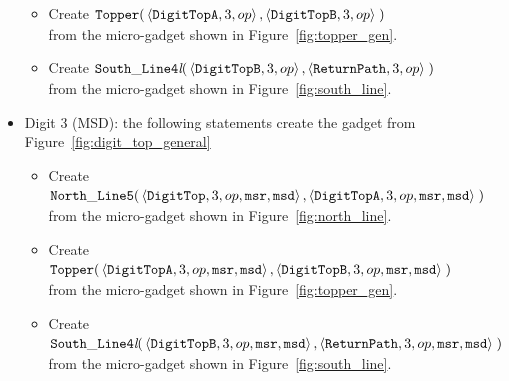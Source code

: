 \begin{itemize}
\begin{itemize}
            \item Create
            $\begin{aligned}[t]
                {\tt Topper}(& \left\langle {\tt DigitTopA}, 3, op  \right\rangle,
                               \left\langle {\tt DigitTopB}, 3, op  \right\rangle \;)
            \end{aligned}$\\from the micro-gadget shown in Figure~\ref{fig:topper_gen}.

            \item Create
            $\begin{aligned}[t]
                {\tt South\_Line4\textit{l}}(& \left\langle {\tt DigitTopB}, 3, op \right\rangle,
                                               \left\langle {\tt ReturnPath},     3, op \right\rangle \;)
            \end{aligned}$\\from the micro-gadget shown in Figure~\ref{fig:south_line}.
        \end{itemize}
        \vspace{1cm}


        \item Digit 3 (MSD): the following statements create the gadget from Figure~\ref{fig:digit_top_general}
        \begin{itemize}
            \item Create
            $\begin{aligned}[t]
                {\tt North\_Line5}(& \left\langle {\tt DigitTop},  3, op, {\tt msr}, {\tt msd}\right\rangle,
                                     \left\langle {\tt DigitTopA}, 3, op, {\tt msr}, {\tt msd}\right\rangle \;)
            \end{aligned}$\\from the micro-gadget shown in Figure~\ref{fig:north_line}.

            \item Create
            $\begin{aligned}[t]
                {\tt Topper}(& \left\langle {\tt DigitTopA}, 3, op, {\tt msr}, {\tt msd}\right\rangle,
                               \left\langle {\tt DigitTopB}, 3, op, {\tt msr}, {\tt msd}\right\rangle \;)
            \end{aligned}$\\ from the micro-gadget shown in Figure~\ref{fig:topper_gen}.


            \item Create
            $\begin{aligned}[t]
                {\tt South\_Line4\textit{l}}(& \left\langle {\tt DigitTopB}, 3, op, {\tt msr}, {\tt msd}\right\rangle,
                                               \left\langle {\tt ReturnPath},     3, op, {\tt msr}, {\tt msd}\right\rangle \;)
            \end{aligned}$\\ from the micro-gadget shown in Figure~\ref{fig:south_line}.
        \end{itemize}

    \end{itemize}


